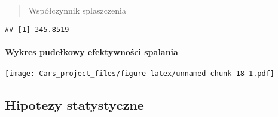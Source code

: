 \documentclass[
]{article}
\newenvironment{Shaded}{\begin{snugshade}}{\end{snugshade}}
\newcommand{\AttributeTok}[1]{\textcolor[rgb]{0.77,0.63,0.00}{#1}}
\newcommand{\CommentTok}[1]{\textcolor[rgb]{0.56,0.35,0.01}{\textit{#1}}}
\newcommand{\ConstantTok}[1]{\textcolor[rgb]{0.00,0.00,0.00}{#1}}
\newcommand{\DecValTok}[1]{\textcolor[rgb]{0.00,0.00,0.81}{#1}}
\newcommand{\FloatTok}[1]{\textcolor[rgb]{0.00,0.00,0.81}{#1}}
\newcommand{\FunctionTok}[1]{\textcolor[rgb]{0.00,0.00,0.00}{#1}}
\newcommand{\NormalTok}[1]{#1}
\newcommand{\OtherTok}[1]{\textcolor[rgb]{0.56,0.35,0.01}{#1}}
\newcommand{\SpecialCharTok}[1]{\textcolor[rgb]{0.00,0.00,0.00}{#1}}
\newcommand{\StringTok}[1]{\textcolor[rgb]{0.31,0.60,0.02}{#1}}
\begin{document}
\begin{quote}
Współczynnik splaszczenia
\end{quote}

\begin{Shaded}
\end{Shaded}

\begin{verbatim}
## [1] 345.8519
\end{verbatim}

\hypertarget{wykres-pudeux142kowy-efektywnoux15bci-spalania}{%
\paragraph{Wykres pudełkowy efektywności
spalania}\label{wykres-pudeux142kowy-efektywnoux15bci-spalania}}

\begin{Shaded}
\end{Shaded}

\texttt{[image: Cars\_project\_files/figure-latex/unnamed-chunk-18-1.pdf]}

\hypertarget{hipotezy-statystyczne}{%
\subsection{Hipotezy statystyczne}\label{hipotezy-statystyczne}}
\end{document}
